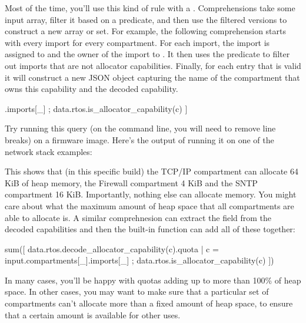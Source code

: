 {Most of the time, you'll use this kind of rule with a .
Comprehensions take some input array, filter it based on a predicate, and then use the filtered versions to construct a new array or set.
For example, the following comprehension starts with every import for every compartment.
For each import, the import is assigned to  and the owner of the import to .
It then uses the  predicate to filter out imports that are not allocator capabilities.
Finally, for each entry that is valid it will construct a new JSON object capturing the name of the compartment that owns this capability and the decoded capability.

\begin{regosnippet}
[
	{
		"owner": owner, 
		"capability": data.rtos.decode_allocator_capability(c)
	\} |
	c = input.compartments[owner].imports[_] ;
	data.rtos.is_allocator_capability(c)
]
\end{regosnippet}

Try running this query (on the command line, you will need to remove line breaks) on a firmware image.
Here's the output of running it on one of the network stack examples:

\begin{jsonsnippet}
[
  {
    "capability": {
      "quota": 4096
    \},
    "owner": "Firewall"
  \},
  {
    "capability": {
      "quota": 16384
    \},
    "owner": "SNTP"
  \},
  {
    "capability": {
      "quota": 65536
    \},
    "owner": "TCPIP"
  \}
]
\end{jsonsnippet}

This shows that (in this specific build) the TCP/IP compartment can allocate 64 KiB of heap memory, the Firewall compartment 4 KiB and the SNTP compartment 16 KiB.
Importantly, nothing else can allocate memory.
You might care about what the maximum amount of heap space that all compartments are able to allocate is.
A similar comprehnesion can extract the  field from the decoded capabilities and then the built-in  function can add all of these together:

\begin{regosnippet}
sum([ data.rtos.decode_allocator_capability(c).quota |
    c = input.compartments[_].imports[_] ;
    data.rtos.is_allocator_capability(c) ])
\end{regosnippet}

In many cases, you'll be happy with quotas adding up to more than 100\% of heap space.
In other cases, you may want to make sure that a particular set of compartments can't allocate more than a fixed amount of heap space, to ensure that a certain amount is available for other uses.

}
